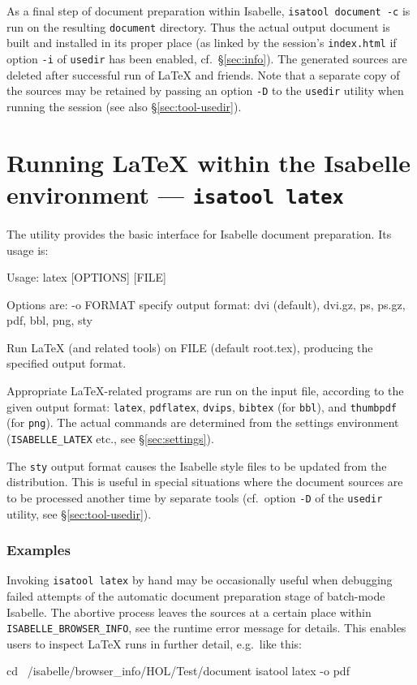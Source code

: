 \medskip As a final step of document preparation within Isabelle,
\texttt{isatool document -c} is run on the resulting \texttt{document}
directory.  Thus the actual output document is built and installed in its
proper place (as linked by the session's \texttt{index.html} if option
\texttt{-i} of \texttt{usedir} has been enabled, cf.\ \S\ref{sec:info}).  The
generated sources are deleted after successful run of {\LaTeX} and friends.
Note that a separate copy of the sources may be retained by passing an option
\texttt{-D} to the \texttt{usedir} utility when running the session (see also
\S\ref{sec:tool-usedir}).


\section{Running {\LaTeX} within the Isabelle environment --- \texttt{isatool latex}}
\label{sec:tool-latex}

The  utility provides the basic interface for Isabelle document
preparation.  Its usage is:
\begin{ttbox}
Usage: latex [OPTIONS] [FILE]

  Options are:
    -o FORMAT    specify output format: dvi (default), dvi.gz, ps,
                 ps.gz, pdf, bbl, png, sty

  Run LaTeX (and related tools) on FILE (default root.tex),
  producing the specified output format.
\end{ttbox}
Appropriate {\LaTeX}-related programs are run on the input file, according to
the given output format: \texttt{latex}, \texttt{pdflatex}, \texttt{dvips},
\texttt{bibtex} (for \texttt{bbl}), and \texttt{thumbpdf} (for \texttt{png}).
The actual commands are determined from the settings environment
(\texttt{ISABELLE_LATEX} etc., see \S\ref{sec:settings}).

The \texttt{sty} output format causes the Isabelle style files to be updated
from the distribution.  This is useful in special situations where the
document sources are to be processed another time by separate tools (cf.\ 
option \texttt{-D} of the \texttt{usedir} utility, see
\S\ref{sec:tool-usedir}).


\subsubsection*{Examples}

Invoking \texttt{isatool latex} by hand may be occasionally useful when
debugging failed attempts of the automatic document preparation stage of
batch-mode Isabelle.  The abortive process leaves the sources at a certain
place within \texttt{ISABELLE_BROWSER_INFO}, see the runtime error message for
details.  This enables users to inspect {\LaTeX} runs in further detail, e.g.\ 
like this:

\begin{ttbox}
  cd ~/isabelle/browser_info/HOL/Test/document
  isatool latex -o pdf
\end{ttbox}


